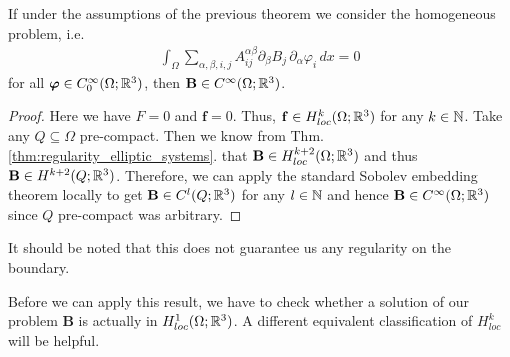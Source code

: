 \documentclass[../master_thesis.tex]{subfiles}
\begin{document}
\begin{corollary}\label{cor:smooth_solution}
    If under the assumptions of the previous theorem we consider the 
    homogeneous problem, i.e.
    \begin{align*}
        \int_\Omega \sum\limits_{\alpha,\beta,i,j} 
        A_{ij}^{\alpha \beta} \partial_\beta B_j \, \partial_\alpha \varphi_i \,dx =0
    \end{align*}
    for all $\bm{\varphi} \in C^\infty_0(\Omega;\mathbb{R}^3)$, then $\mathbf{B}\in C^\infty(\Omega;\mathbb{R}^3)$.
\end{corollary}
\begin{proof}
    Here we have $F= 0$ and $\mathbf{f} = 0$. Thus, $\mathbf{f} \in H^k_{loc}(\Omega;\mathbb{R}^3)$ 
    for any $k \in \mathbb{N}$. 
    Take any $Q \subseteq \Omega$ pre-compact. Then we know from 
    Thm.\,\ref{thm:regularity_elliptic_systems}.
    that $\mathbf{B} \in H_{loc}^{k+2}(\Omega;\mathbb{R}^3)$ and thus $\mathbf{B} \in H^{k+2}(Q;\mathbb{R}^3)$.
    Therefore, we can apply the 
    standard Sobolev embedding theorem locally to get $\mathbf{B} \in C^l(Q;\mathbb{R}^3)$ for any 
    $l \in \mathbb{N}$ and hence $\mathbf{B} \in C^\infty(\Omega;\mathbb{R}^3)$ since $Q$ pre-compact
    was arbitrary. 
\end{proof}
It should be noted that this does not guarantee us any regularity on the 
boundary. 

Before we can apply this result, we have to check whether a solution of our 
problem $\mathbf{B}$ is actually in $H^1_{loc}(\Omega;\mathbb{R}^3)$. A different 
equivalent classification of $H^k_{loc}$ will be helpful.
\end{document}
